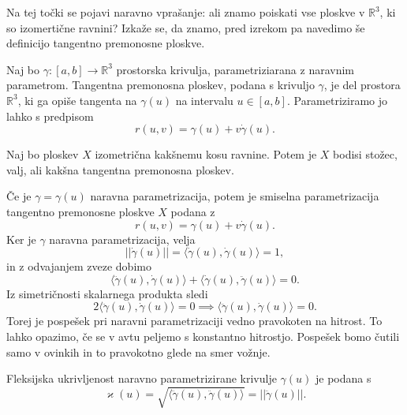 Na tej točki se pojavi naravno vprašanje: ali znamo poiskati vse ploskve v $\mathbb{R}^3$, ki so izomertične ravnini?
Izkaže se, da znamo, pred izrekom pa navedimo še definicijo tangentno premonosne ploskve.
\begin{definicija}
  \label{def_tangentno_premonsna_ploskev}
   Naj bo $\gamma: [a,b] \to  \mathbb{R}^3$ prostorska krivulja, parametriziarana z naravnim parametrom. Tangentna premonosna ploskev,
   podana s krivuljo $\gamma$, je del prostora $\mathbb{R}^3$, ki ga opiše tangenta na $\gamma(u)$ na intervalu $u \in  [a,b]$. Parametriziramo jo lahko s predpisom \begin{equation*}
   r(u, v) = \gamma(u) + v\dot{\gamma}(u).
   \end{equation*}  
     
  \end{definicija}
\begin{izrek}
\label{izr_izometricnost_ploskev_ravnini}
Naj bo ploskev $X$ izometrična kakšnemu kosu ravnine. Potem je $X$ bodisi stožec, valj, ali kakšna tangentna premonosna ploskev.
\end{izrek}



Če je $\gamma = \gamma(u)$ naravna parametrizacija, potem je smiselna parametrizacija tangentno premonosne ploskve $X$
podana z 
\begin{equation*} r(u,v) = \gamma(u) + v \dot{\gamma}(u).\end{equation*}Ker je $\gamma$ naravna parametrizacija, velja \begin{equation*} \lvert\lvert \dot{\gamma}(u) \rvert\rvert = \langle \dot{\gamma}(u), \dot{\gamma}(u) \rangle  = 1, \end{equation*}in z odvajanjem zveze dobimo 
\begin{equation*} \langle \ddot{\gamma}(u) , \dot{\gamma}(u) \rangle + \langle \dot{\gamma}(u) , \ddot{\gamma}(u) \rangle = 0.  \end{equation*}
Iz simetričnosti skalarnega produkta sledi 
\begin{equation*} 2 \langle \ddot{\gamma}(u) , \dot{\gamma}(u) \rangle = 0 \implies \langle \ddot{\gamma}(u) , \dot{\gamma}(u) \rangle = 0. \end{equation*}
Torej je pospešek pri naravni parametrizaciji vedno pravokoten na hitrost. To lahko opazimo, če se v avtu peljemo s konstantno hitrostjo. Pospešek bomo čutili
samo v ovinkih in to pravokotno glede na smer vožnje.

\begin{definicija}
\label{def_fleksijska_ukrivljenost}
 Fleksijska ukrivljenost naravno parametrizirane krivulje $\gamma(u)$ je podana s 
 \begin{equation*} \varkappa(u) = \sqrt{\langle \ddot{\gamma}(u), \ddot{\gamma}(u) \rangle } = \lvert\lvert \ddot{\gamma}(u) \rvert\rvert. \end{equation*}
\end{definicija}


